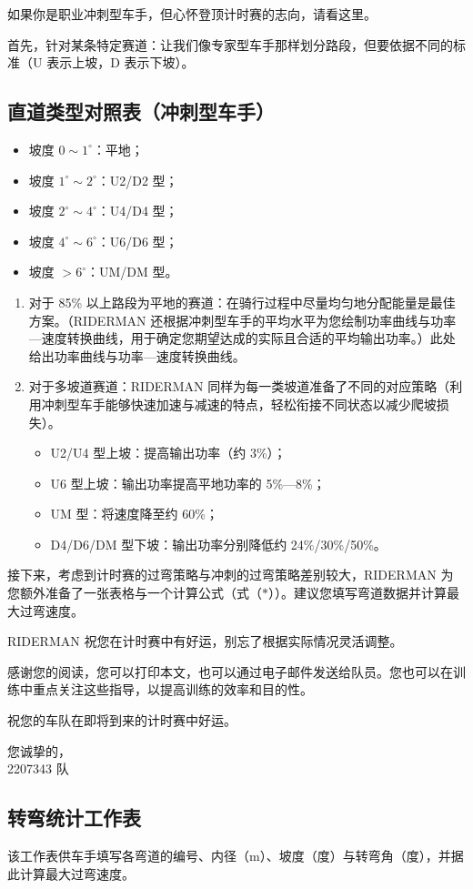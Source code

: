 \documentclass[11pt,a4paper]{ctexart}
\begin{document}
如果你是职业冲刺型车手，但心怀登顶计时赛的志向，请看这里。

首先，针对某条特定赛道：让我们像专家型车手那样划分路段，但要依据不同的标准（U 表示上坡，D 表示下坡）。

\subsection*{直道类型对照表（冲刺型车手）}

\begin{itemize}
\item 坡度 $0\sim 1^{\circ}$：平地；
\item 坡度 $1^{\circ}\sim 2^{\circ}$：U2/D2 型；
\item 坡度 $2^{\circ}\sim 4^{\circ}$：U4/D4 型；
\item 坡度 $4^{\circ}\sim 6^{\circ}$：U6/D6 型；
\item 坡度 $>6^{\circ}$：UM/DM 型。
\end{itemize}

\begin{enumerate}
\item 对于 85\% 以上路段为平地的赛道：在骑行过程中尽量均匀地分配能量是最佳方案。（RIDERMAN 还根据冲刺型车手的平均水平为您绘制功率曲线与功率—速度转换曲线，用于确定您期望达成的实际且合适的平均输出功率。）此处给出功率曲线与功率—速度转换曲线。
\item 对于多坡道赛道：RIDERMAN 同样为每一类坡道准备了不同的对应策略（利用冲刺型车手能够快速加速与减速的特点，轻松衔接不同状态以减少爬坡损失）。
  \begin{itemize}
  \item U2/U4 型上坡：提高输出功率（约 3\%）；
  \item U6 型上坡：输出功率提高平地功率的 5\%—8\%；
  \item UM 型：将速度降至约 60\%；
  \item D4/D6/DM 型下坡：输出功率分别降低约 24\%/30\%/50\%。
  \end{itemize}
\end{enumerate}

接下来，考虑到计时赛的过弯策略与冲刺的过弯策略差别较大，RIDERMAN 为您额外准备了一张表格与一个计算公式（式（$\ast$））。建议您填写弯道数据并计算最大过弯速度。

RIDERMAN 祝您在计时赛中有好运，别忘了根据实际情况灵活调整。

感谢您的阅读，您可以打印本文，也可以通过电子邮件发送给队员。您也可以在训练中重点关注这些指导，以提高训练的效率和目的性。

祝您的车队在即将到来的计时赛中好运。

\begin{flushright}
您诚挚的，\\
2207343 队
\end{flushright}

\subsection*{转弯统计工作表}

该工作表供车手填写各弯道的编号、内径（m）、坡度（度）与转弯角（度），并据此计算最大过弯速度。
\end{document}
